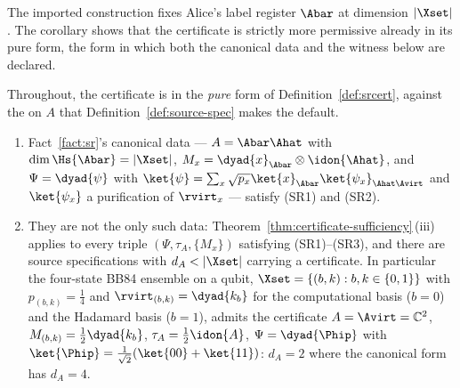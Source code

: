 
The imported construction fixes Alice's label register $\Abar$ at dimension
$|\Xset|$. The corollary shows that the certificate is strictly more
permissive already in its pure form, the form in which both the canonical data
and the witness below are declared.

\begin{corollary}
\label{cor:noncanonical}
Throughout, the certificate is in the \emph{pure} form of
Definition~\ref{def:srcert}, against the  on $A$ that
Definition~\ref{def:source-spec} makes the default.
\begin{enumerate}[label=(\roman*),leftmargin=2.2em]
\item Fact~\ref{fact:sr}'s canonical data --- $A=\Abar\Ahat$ with
$\dim\Hs{\Abar}=|\Xset|$, $M_x=\dyad{x}_{\Abar}\otimes\idon{\Ahat}$, and
$\Psi=\dyad{\psi}$ with
$\ket{\psi}=\sum_x\sqrt{p_x}\ket{x}_{\Abar}\ket{\psi_x}_{\Ahat\Avirt}$ and
$\ket{\psi_x}$ a purification of $\rvirt_x$ --- satisfy (SR1) and (SR2).
\item They are not the only such data: Theorem~\ref{thm:certificate-sufficiency}\,(iii)
applies to every triple $(\Psi,\tau_A,\{M_x\})$ satisfying (SR1)--(SR3), and
there are source
specifications with $d_A<|\Xset|$ carrying a certificate. In particular the
four-state BB84 ensemble on a qubit, $\Xset=\{(b,k):b,k\in\{0,1\}\}$ with
$p_{(b,k)}=\tfrac14$ and $\rvirt_{(b,k)}=\dyad{k_b}$ for the computational
basis ($b=0$) and the Hadamard basis ($b=1$), admits the certificate
$A=\Avirt=\mathbb{C}^2$, $M_{(b,k)}=\tfrac12\dyad{k_b}$,
$\tau_A=\tfrac12\idon{A}$, $\Psi=\dyad{\Phip}$ with
$\ket{\Phip}=\tfrac1{\sqrt2}(\ket{00}+\ket{11})$: $d_A=2$ where the
canonical form has $d_A=4$.
\end{enumerate}
\end{corollary}

